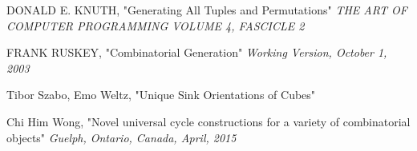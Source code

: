 \documentclass{pracamgr}
\begin{document}
\begin{thebibliography}{99}
   DONALD E. KNUTH,
   "Generating All Tuples and Permutations"
   \textit{THE ART OF COMPUTER PROGRAMMING VOLUME 4, FASCICLE 2}
  
   FRANK RUSKEY,
   "Combinatorial Generation"
   \textit{Working Version, October 1, 2003}

   Tibor Szabo, Emo Weltz,
   "Unique Sink Orientations of Cubes"
   
   Chi Him Wong,
   "Novel universal cycle constructions for a variety of combinatorial objects"
   \textit{Guelph, Ontario, Canada, April, 2015}
   
\end{thebibliography}
\end{document}
